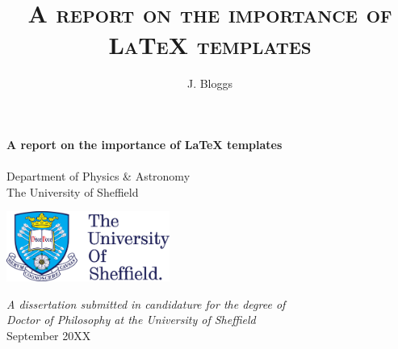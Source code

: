\title{\textsc{A report on the importance of \LaTeX{} templates}}
\author{J. Bloggs}

\thispagestyle{empty}

\begin{center}
\fontsize{24.88}{57.6}
\vspace*{-1cm}

\textbf{A report on the importance of \LaTeX{} templates}\\
\vspace*{2.5cm}
\LARGE
{}\\
\vspace{2cm}
\Large{Department of Physics \& Astronomy}\\
\Large{The University of Sheffield}\\
\vspace*{1cm}

\includegraphics[width=0.4\textwidth]{./images/University_of_Sheffield_logo.png}\\

\vspace*{1cm}

\large
{\it A dissertation submitted in candidature for the degree of}\\
{\it Doctor of Philosophy at the University of Sheffield}\\
\vspace*{1.5cm}
{September 20XX}
\vfill
\end{center}

\afterpage{\blankpage}
